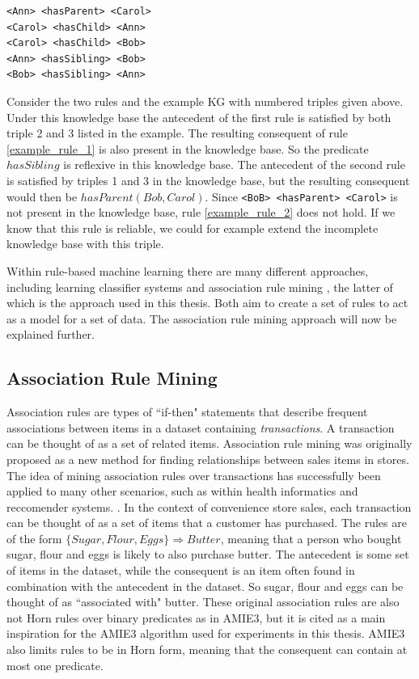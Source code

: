 \begin{example}[A simple KG.]
\begin{lstlisting}[]
<Ann> <hasParent> <Carol>
<Carol> <hasChild> <Ann>
<Carol> <hasChild> <Bob>
<Ann> <hasSibling> <Bob>
<Bob> <hasSibling> <Ann>
\end{lstlisting}
\label{mini_KG_rules}
\end{example}


Consider the two rules and the example KG with numbered triples given above. Under this knowledge base the antecedent of the first rule is satisfied by both triple 2 and 3 listed in the example. The resulting consequent of rule \ref{example_rule_1} is also present in the knowledge base. So the predicate $hasSibling$ is reflexive in this knowledge base. The antecedent of the second rule is satisfied by triples 1 and 3 in the knowledge base, but the resulting consequent would then be $hasParent(Bob, Carol)$. Since \texttt{<BoB> <hasParent> <Carol>} is not present in the knowledge base, rule \ref{example_rule_2} does not hold. If we know that this rule is reliable, we could for example extend the incomplete knowledge base with this triple.

Within rule-based machine learning there are many different approaches, including learning classifier systems \cite{sigaud2007learning} and association rule mining \cite{agrawal1993mining}, the latter of which is the approach used in this thesis. Both aim to create a set of rules to act as a model for a set of data. The association rule mining approach will now be explained further.


\subsection{Association Rule Mining}
Association rules \cite{agrawal1993mining} are types of ``if-then" statements that describe frequent associations between items in a dataset containing \textit{transactions}. A transaction can be thought of as a set of related items. Association rule mining was originally proposed as a new method for finding relationships between sales items in stores. The idea of mining association rules over transactions has successfully been applied to many other scenarios, such as within health informatics and reccomender systems. \cite{altaf2017applications, lin2002efficient}. In the context of convenience store sales, each transaction can be thought of as a set of items that a customer has purchased. The rules are of the form $\{Sugar, Flour, Eggs\} \Rightarrow Butter$, meaning that a person who bought sugar, flour and eggs is likely to also purchase butter. The antecedent is some set of items in the dataset, while the consequent is an item often found in combination with the antecedent in the dataset.  So sugar, flour and eggs can be thought of as ``associated with" butter. These original association rules are also not Horn rules over binary predicates as in AMIE3, but it is cited as a main inspiration for the AMIE3 algorithm used for experiments in this thesis. AMIE3 also limits rules to be in Horn form, meaning that the consequent can contain at most one predicate.

